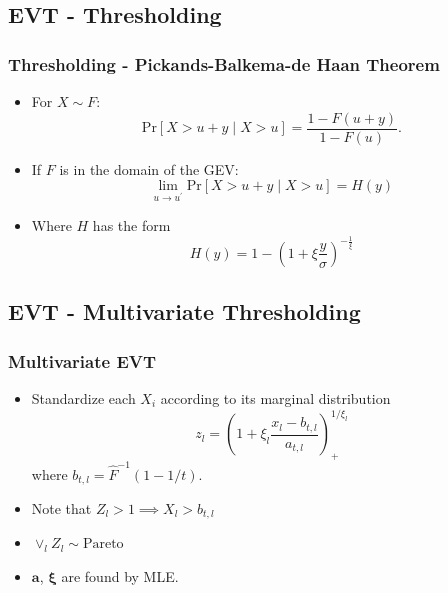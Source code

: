 \documentclass[aspectratio=169]{beamer}
\begin{document}
\subsection{EVT - Thresholding}

\begin{frame}
  \frametitle{Thresholding - Pickands-Balkema-de Haan Theorem}
  \begin{itemize}
    \item For $X \sim F$:
      \begin{equation*}
        \text{Pr}\left[X > u + y\mid X > u\right] = \frac{1 - F(u + y)}{1 - F(u)}.
      \end{equation*}
    \pause
    \item If $F$ is in the domain of the GEV:
      \begin{equation*}
        \lim\limits_{u\to u^{\prime}}\text{Pr}\left[X > u + y\mid X > u\right] = H(y)
      \end{equation*}
    \pause
    \item Where $H$ has the form
      \begin{equation*}
        H(y) = 1 - \left(1 + \xi\frac{y}{\sigma}\right)^{-\frac{1}{\xi}}
      \end{equation*}
  \end{itemize}
\end{frame} %

\subsection{EVT - Multivariate Thresholding}

\begin{frame}
  \frametitle{Multivariate EVT}
  \begin{itemize}
    \item Standardize each $X_i$ according to its marginal distribution
        \begin{equation*}
          z_l = \left(1 + \xi_l\frac{x_l - b_{t,l}}{a_{t,l}}\right)_{+}^{1/\xi_l}
        \end{equation*}
		where $b_{t,l} = \hat{F}^{-1}(1 - 1/t)$.
    \item Note that $Z_l > 1\implies X_l > b_{t,l}$
    \item $\vee_l Z_l \sim \text{Pareto}$
	\item $\bm{a}$, $\bm{\xi}$ are found by MLE.
  \end{itemize}
\end{frame} %
\end{document}
